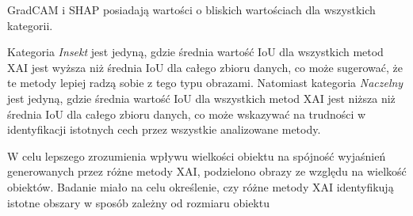 GradCAM i SHAP posiadają wartości o bliskich wartościach dla wszystkich kategorii.

Kategoria \textit{Insekt} jest jedyną, gdzie średnia wartość IoU dla wszystkich metod XAI jest wyższa niż średnia IoU dla całego zbioru danych, co może sugerować, że te metody lepiej radzą sobie z tego typu obrazami.
Natomiast kategoria \textit{Naczelny} jest jedyną, gdzie średnia wartość IoU dla wszystkich metod XAI jest niższa niż średnia IoU dla całego zbioru danych, co może wskazywać na trudności w identyfikacji istotnych cech przez wszystkie analizowane metody.

\vspace{1cm}
W celu lepszego zrozumienia wpływu wielkości obiektu na spójność wyjaśnień generowanych przez różne metody XAI, podzielono obrazy ze względu na wielkość obiektów.
Badanie miało na celu określenie, czy różne metody XAI identyfikują istotne obszary w sposób zależny od rozmiaru obiektu

